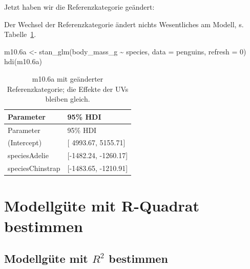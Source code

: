 \documentclass[
  a4paper,
  DIV=11]{scrreprt}
\newenvironment{Shaded}{\begin{snugshade}}{\end{snugshade}}
\newcommand{\AttributeTok}[1]{\textcolor[rgb]{0.40,0.45,0.13}{#1}}
\newcommand{\DecValTok}[1]{\textcolor[rgb]{0.68,0.00,0.00}{#1}}
\newcommand{\DocumentationTok}[1]{\textcolor[rgb]{0.37,0.37,0.37}{\textit{#1}}}
\newcommand{\FloatTok}[1]{\textcolor[rgb]{0.68,0.00,0.00}{#1}}
\newcommand{\FunctionTok}[1]{\textcolor[rgb]{0.28,0.35,0.67}{#1}}
\newcommand{\NormalTok}[1]{\textcolor[rgb]{0.00,0.23,0.31}{#1}}
\newcommand{\OtherTok}[1]{\textcolor[rgb]{0.00,0.23,0.31}{#1}}
\newcommand{\SpecialCharTok}[1]{\textcolor[rgb]{0.37,0.37,0.37}{#1}}
\theoremstyle{definition}
\theoremstyle{remark}
\begin{document}
Jetzt haben wir die Referenzkategorie geändert:

\begin{Shaded}
\end{Shaded}

Der Wechsel der Referenzkategorie ändert nichts Wesentliches am Modell,
s. Tabelle~\ref{tbl-m106a}.

\begin{Shaded}
\begin{Highlighting}[]
\NormalTok{m10}\FloatTok{.6}\NormalTok{a }\OtherTok{\textless{}{-}} \FunctionTok{stan\_glm}\NormalTok{(body\_mass\_g }\SpecialCharTok{\textasciitilde{}}\NormalTok{ species, }\AttributeTok{data =}\NormalTok{ penguins, }\AttributeTok{refresh =} \DecValTok{0}\NormalTok{)}
\FunctionTok{hdi}\NormalTok{(m10}\FloatTok{.6}\NormalTok{a)}
\end{Highlighting}
\end{Shaded}

\hypertarget{tbl-m106a}{}
\begin{longtable}[]{@{}ll@{}}
\caption{\label{tbl-m106a}m10.6a mit geänderter Referenzkategorie; die
Effekte der UVs bleiben gleich.}\tabularnewline
\toprule()
Parameter & 95\% HDI \\
\midrule()
\endfirsthead
\toprule()
Parameter & 95\% HDI \\
\midrule()
\endhead
(Intercept) & {[} 4993.67, 5155.71{]} \\
speciesAdelie & {[}-1482.24, -1260.17{]} \\
speciesChinstrap & {[}-1483.65, -1210.91{]} \\
\bottomrule()
\end{longtable}

\hypertarget{modellguxfcte-mit-r-quadrat-bestimmen}{%
\section{Modellgüte mit R-Quadrat
bestimmen}\label{modellguxfcte-mit-r-quadrat-bestimmen}}

\hypertarget{modellguxfcte-mit-r2-bestimmen}{%
\subsection{\texorpdfstring{Modellgüte mit \(R^2\)
bestimmen}{Modellgüte mit R\^{}2 bestimmen}}\label{modellguxfcte-mit-r2-bestimmen}}
\end{document}
